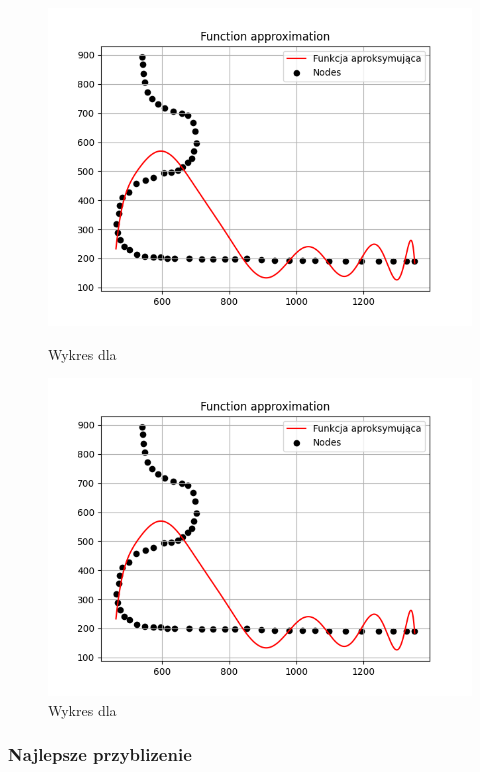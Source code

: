 \documentclass{article}
\begin{document}
\begin{figure}[H]
  \begin{minipage}[b]{0.49\textwidth}
    \includegraphics[width=\textwidth]{img.png}
    \caption{Wykres dla }
  \end{minipage}
  \hfill
  \begin{minipage}[b]{0.49\textwidth}
    \includegraphics[width=\textwidth]{img.png}
    \caption{Wykres dla }
  \end{minipage}
\end{figure}

\subsubsection{Najlepsze przyblizenie}
\end{document}
